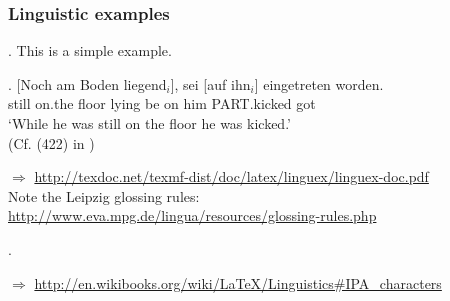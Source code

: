 \begin{frame}[fragile]
\begin{itemize}
\end{itemize} 

\end{frame}

\begin{frame}
\frametitle{Linguistic examples}
\ex. This is a simple example.

\exg. [Noch am Boden liegend$_i$], sei [auf ihn$_i$] eingetreten worden.\\
still on.the floor lying be on him PART.kicked got\\
`While he was still on the floor he was kicked.'\\
(Cf. (422) in \cite{Mueller:02})

\noindent $\Rightarrow$ \url{http://texdoc.net/texmf-dist/doc/latex/linguex/linguex-doc.pdf} \\
Note the Leipzig glossing rules: \url{http://www.eva.mpg.de/lingua/resources/glossing-rules.php}

\ex. 

$\Rightarrow$ \url{http://en.wikibooks.org/wiki/LaTeX/Linguistics#IPA_characters}
\end{frame}

